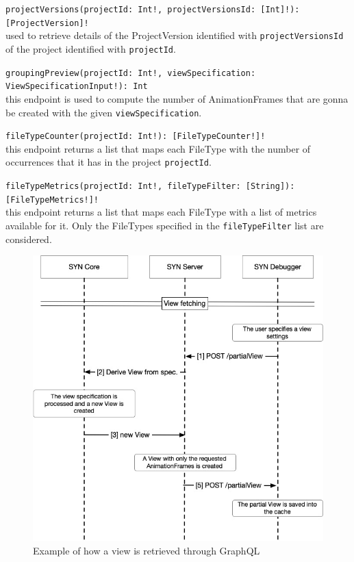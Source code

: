 \texttt{projectVersions(projectId: Int!, projectVersionsId: [Int]!): [ProjectVersion]!} \\
used to retrieve details of the ProjectVersion identified with \texttt{projectVersionsId} of the project identified with \texttt{projectId}.

\texttt{groupingPreview(projectId: Int!, viewSpecification: ViewSpecificationInput!): Int} \\
this endpoint is used to compute the number of AnimationFrames that are gonna be created with the given \texttt{viewSpecification}.

\texttt{fileTypeCounter(projectId: Int!): [FileTypeCounter!]!} \\
this endpoint returns a list that maps each FileType with the number of occurrences that it has in the project \texttt{projectId}.

\texttt{fileTypeMetrics(projectId: Int!, fileTypeFilter: [String]): [FileTypeMetrics!]!} \\
this endpoint returns a list that maps each FileType with a list of metrics available for it. Only the FileTypes specified in the \texttt{fileTypeFilter} list are considered. 



\begin{figure}
    \center
    \includegraphics[width=\textwidth]{ServertClientFlow.jpg}
    \caption{Example of how a view is retrieved through GraphQL}
    \label{fig:ServertClientFlow}
\end{figure}


